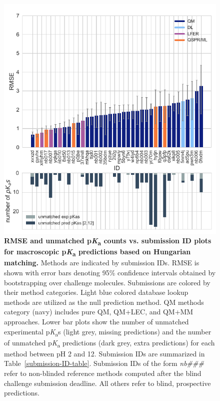 \documentclass[9pt,lineno,final]{elife}
\newcommand{\pKa}{p\textit{K}\textsubscript{a}}
\begin{document}
\begin{figure}[h]
\centering
\includegraphics[width=0.5\linewidth]{figures/typeIII-rmse-unmatched-pKa-fig.pdf}
\caption{{\bf RMSE and unmatched \pKa{} counts vs. submission ID plots for macroscopic \pKa{} predictions based on Hungarian matching.} 
Methods are indicated by submission IDs. 
RMSE is shown with error bars denoting 95\% confidence intervals obtained by bootstrapping over challenge molecules. 
Submissions are colored by their method categories. Light blue colored database lookup methods are utilized as the null prediction method.
QM methods category (navy) includes pure QM, QM+LEC, and QM+MM approaches.
Lower bar plots show the number of unmatched experimental \pKa{}s (light grey, missing predictions) and the number of unmatched \pKa{} predictions (dark grey, extra predictions) for each method between pH 2 and 12. Submission IDs are summarized in Table~\ref{submission-ID-table}. Submission IDs of the form \textit{nb\#\#\#} refer to non-blinded reference methods computed after the blind challenge submission deadline. All others refer to blind, prospective predictions. 
}
\label{fig:typeIII-rmse-plot}
\end{figure}
\end{document}
